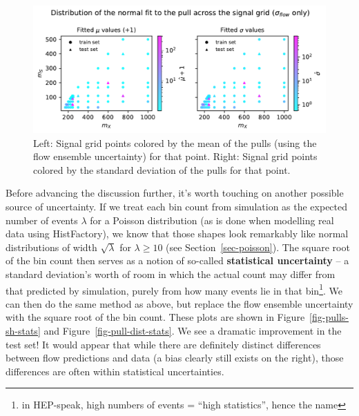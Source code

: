 \documentclass[
  11pt,
  numbers=noendperiod]{book}
\begin{document}
\begin{figure}

{\centering \includegraphics{./images/sh/pull-dist.pdf}

}

\caption{\label{fig-pull-dist}Left: Signal grid points colored by the
mean of the pulls (using the flow ensemble uncertainty) for that point.
Right: Signal grid points colored by the standard deviation of the pulls
for that point.}

\end{figure}

Before advancing the discussion further, it's worth touching on another
possible source of uncertainty. If we treat each bin count from
simulation as the expected number of events \(\lambda\) for a Poisson
distribution (as is done when modelling real data using HistFactory), we
know that those shapes look remarkably like normal distributions of
width \(\sqrt{\lambda}\) for \(\lambda \geqslant 10\) (see
Section~\ref{sec-poisson}). The square root of the bin count then serves
as a notion of so-called \textbf{statistical uncertainty} -- a standard
deviation's worth of room in which the actual count may differ from that
predicted by simulation, purely from how many events lie in that
bin\footnote{in HEP-speak, high numbers of events = ``high statistics'',
  hence the name}. We can then do the same method as above, but replace
the flow ensemble uncertainty with the square root of the bin count.
These plots are shown in Figure~\ref{fig-pulls-sh-stats} and
Figure~\ref{fig-pull-dist-stats}. We see a dramatic improvement in the
test set! It would appear that while there are definitely distinct
differences between flow predictions and data (a bias clearly still
exists on the right), those differences are often within statistical
uncertainties.
\end{document}
